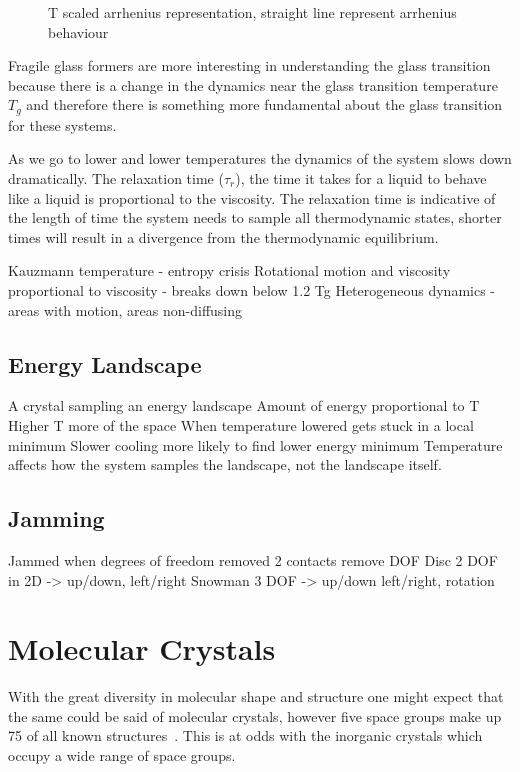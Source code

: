 \begin{figure}
    \caption{T scaled arrhenius representation, straight line represent arrhenius behaviour}
    \label{fig:angell}
\end{figure}

Fragile glass formers are more interesting in understanding the glass transition because there is a change in the dynamics near the glass transition temperature $T_g$ and therefore there is something more fundamental about the glass transition for these systems. 

As we go to lower and lower temperatures the dynamics of the system slows down dramatically. The relaxation time ($\tau_r$), the time it takes for a liquid to behave like a liquid is proportional to the viscosity. The relaxation time is indicative of the length of time the system needs to sample all thermodynamic states, shorter times will result in a divergence from the thermodynamic equilibrium.


Kauzmann temperature - entropy crisis
Rotational motion and viscosity proportional to viscosity - breaks down below 1.2 Tg
Heterogeneous dynamics - areas with motion, areas non-diffusing

\subsection{Energy Landscape}
A crystal sampling an energy landscape
Amount of energy proportional to T
Higher T more of the space
When temperature lowered gets stuck in a local minimum
Slower cooling more likely to find lower energy minimum
Temperature affects how the system samples the landscape, not the landscape itself.

\subsection{Jamming}
Jammed when degrees of freedom removed
2 contacts remove DOF
Disc 2 DOF in 2D -> up/down, left/right
Snowman 3 DOF -> up/down left/right, rotation

\section{Molecular Crystals}

With the great diversity in molecular shape and structure one might expect that the same could be said of molecular crystals, however five space groups make up \si{75}{\percent} of all known structures~\cite{brock:94}. This is at odds with the inorganic crystals which occupy a wide range of space groups.

